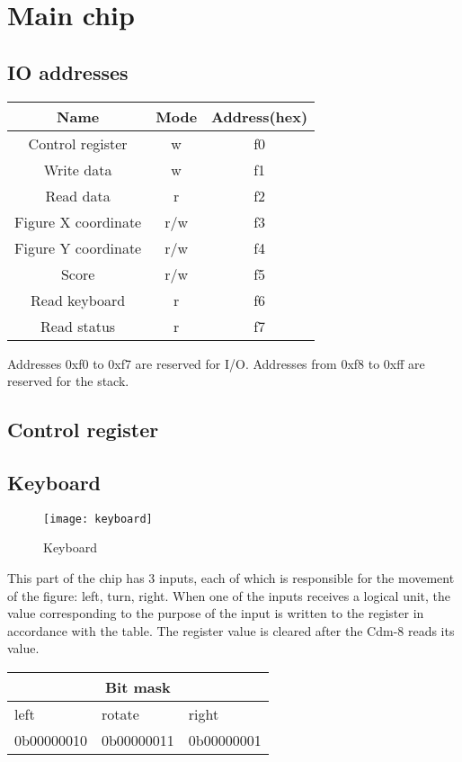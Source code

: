 \documentclass[./main.tex]{subfiles}
\begin{document}
	\section{Main chip}
	\subsection{IO addresses}
	\begin{center}
		\begin{tabular}{|c | c | c|}
			\hline
			Name & Mode & Address(hex) \\
			\hline
			Control register & w & f0 \\
			\hline
			Write data & w & f1 \\
			\hline
			Read data & r & f2 \\
			\hline
			Figure X coordinate & r/w & f3 \\
			\hline
			Figure Y coordinate & r/w & f4 \\
			\hline
			Score & r/w & f5 \\
			\hline
			Read keyboard & r & f6 \\
			\hline
			Read status & r & f7\\
			\hline
		\end{tabular}
	\end{center}
	Addresses 0xf0 to 0xf7 are reserved for I/O.  Addresses from 0xf8 to 0xff are reserved for the stack.
	\subsection{Control register}
	
	\subsection{Keyboard}
	\begin{figure}[h]
		\centering
		\texttt{[image: keyboard]}
		\label{fig:img2}
		\caption{Keyboard}
	\end{figure}
	This part of the chip has 3 inputs, each of which is responsible for the movement of the figure: left, turn, right. When one of the inputs receives a logical unit, the value corresponding to the purpose of the input is written to the register in accordance with the table. The register value is cleared after the Cdm-8 reads its value.
	\begin{center}
		\begin{tabular}{|p{3cm}|p{3cm}|p{3cm}|}
			\hline
			\multicolumn{3}{|c|}{Bit mask} \\
			\hline
			left & rotate & right \\
			\hline
			0b00000010 & 0b00000011 & 0b00000001 \\
			\hline
		\end{tabular}
	\end{center}
\end{document}
